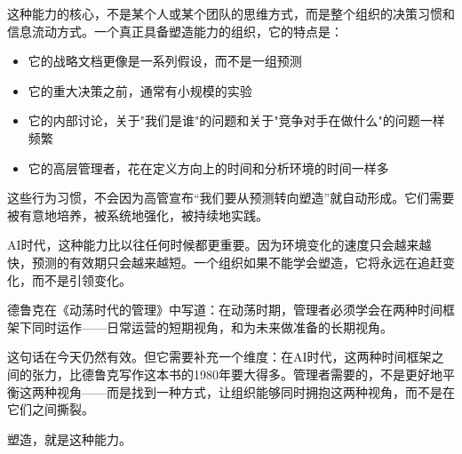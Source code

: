 这种能力的核心，不是某个人或某个团队的思维方式，而是整个组织的决策习惯和信息流动方式。一个真正具备塑造能力的组织，它的特点是：

\begin{itemize}
\item 它的战略文档更像是一系列假设，而不是一组预测
\item 它的重大决策之前，通常有小规模的实验
\item 它的内部讨论，关于"我们是谁"的问题和关于"竞争对手在做什么"的问题一样频繁
\item 它的高层管理者，花在定义方向上的时间和分析环境的时间一样多

\end{itemize}
这些行为习惯，不会因为高管宣布“我们要从预测转向塑造”就自动形成。它们需要被有意地培养，被系统地强化，被持续地实践。

AI时代，这种能力比以往任何时候都更重要。因为环境变化的速度只会越来越快，预测的有效期只会越来越短。一个组织如果不能学会塑造，它将永远在追赶变化，而不是引领变化。

德鲁克在《动荡时代的管理》中写道：在动荡时期，管理者必须学会在两种时间框架下同时运作——日常运营的短期视角，和为未来做准备的长期视角。

这句话在今天仍然有效。但它需要补充一个维度：在AI时代，这两种时间框架之间的张力，比德鲁克写作这本书的1980年要大得多。管理者需要的，不是更好地平衡这两种视角——而是找到一种方式，让组织能够同时拥抱这两种视角，而不是在它们之间撕裂。

塑造，就是这种能力。

